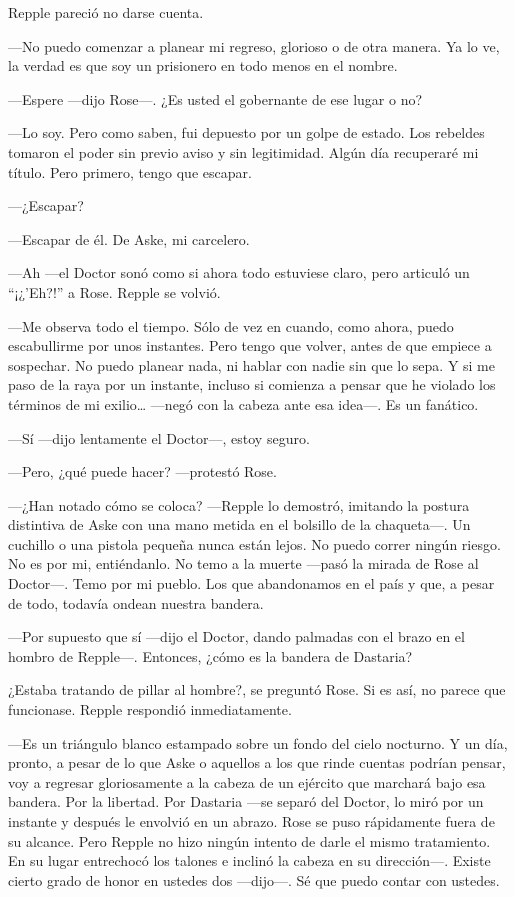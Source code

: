 {Repple pareció no darse cuenta.}

{---No puedo comenzar a planear mi regreso, glorioso o de otra manera.
	Ya lo ve, la verdad es que soy un prisionero en todo menos en el
nombre.}

{---Espere ---dijo Rose---. ¿Es usted el gobernante de ese lugar o no?}

{---Lo soy. Pero como saben, fui depuesto por un golpe de estado. Los
	rebeldes tomaron el poder sin previo aviso y sin legitimidad. Algún día
recuperaré mi título. Pero primero, tengo que escapar.}

{---¿Escapar?}

{---Escapar de él. De Aske, mi carcelero.}

{---Ah ---el Doctor sonó como si ahora todo estuviese claro, pero
articuló un ``¡¿'Eh?!'' a Rose. Repple se volvió.}

{---Me observa todo el tiempo. Sólo de vez en cuando, como ahora, puedo
	escabullirme por unos instantes. Pero tengo que volver, antes de que
	empiece a sospechar. No puedo planear nada, ni hablar con nadie sin que
	lo sepa. Y si me paso de la raya por un instante, incluso si comienza a
	pensar que he violado los términos de mi exilio\ldots{} ---negó con la
cabeza ante esa idea---. Es un fanático.}

{---Sí ---dijo lentamente el Doctor---, estoy seguro.}

{---Pero, ¿qué puede hacer? ---protestó Rose.}

{---¿Han notado cómo se coloca? ---Repple lo demostró, imitando la
	postura distintiva de Aske con una mano metida en el bolsillo de la
	chaqueta---. Un cuchillo o una pistola pequeña nunca están lejos. No
	puedo correr ningún riesgo. No es por mi, entiéndanlo. No temo a la
	muerte ---pasó la mirada de Rose al Doctor---. Temo por mi pueblo. Los
	que abandonamos en el país y que, a pesar de todo, todavía ondean
nuestra bandera.}

{---Por supuesto que sí ---dijo el Doctor, dando palmadas con el brazo
en el hombro de Repple---. Entonces, ¿cómo es la bandera de Dastaria?}

{¿Estaba tratando de pillar al hombre?, se preguntó Rose. Si es así, no
parece que funcionase. Repple respondió inmediatamente.}

{---Es un triángulo blanco estampado sobre un fondo del cielo nocturno.
	Y un día, pronto, a pesar de lo que Aske o aquellos a los que rinde
	cuentas podrían pensar, voy a regresar gloriosamente a la cabeza de un
	ejército que marchará bajo esa bandera. Por la libertad. Por Dastaria
	---se separó del Doctor, lo miró por un instante y después le envolvió
	en un abrazo. Rose se puso rápidamente fuera de su alcance. Pero Repple
	no hizo ningún intento de darle el mismo tratamiento. En su lugar
	entrechocó los talones e inclinó la cabeza en su dirección---. Existe
	cierto grado de honor en ustedes dos ---dijo---. Sé que puedo contar con
ustedes.}

